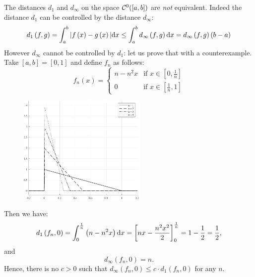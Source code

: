 \begin{exam}
	The distances $d_1$ and $d_\infty$ on the space $\mathcal C^0([a, b])$ are \textit{not} equivalent. Indeed the distance $d_1$ can be controlled by the distance $d_\infty$:
	$$ d_1\left(f,g\right)=\int_{a}^{b}|f\left(x\right)-g\left(x\right)|\mathrm d x \leq \int_{a}^{b} d_\infty\left(f,g\right) \mathrm d x= d_\infty \left(f,g\right)\left(b-a\right)$$
	However $d_\infty$ cannot be controlled by $d_1$: let us prove that with a counterexample. Take $\left[a,b\right]=\left[0,1\right]$ and define $f_n$ as follows:
	$$f_n\left(x\right) = \begin{cases}
	n-n^2x & \text{if } x\in \left[0,\frac 1 n\right] \\
	0 & \text{if }x\in \left[\frac 1 n,1\right]
	\end{cases}$$
	\begin{figure}[htpb]
		\centering
		\includegraphics[width = 0.55\textwidth]{images/distances_not_equivalent}
	\end{figure}
	\FloatBarrier
	Then we have:
	$$
		d_1\left(f_n,0\right) 
		= \int_{0}^{\frac 1 n}\left(n-n^2x\right)\mathrm d x 
		= \left[nx-\frac{n^2x^2} 2\right]_0^\frac 1 n 
		= 1 - \frac 1 2 
		= \frac 1 2
	,
	$$
	and
	$$
		d_\infty(f_n, 0) 
		= n
	.
	$$
	Hence, there is no $c>0$ such that $d_\infty\left(f_n,0\right)\leq c\cdot d_1\left(f_n,0\right)$ for any $n$.
\end{exam}
